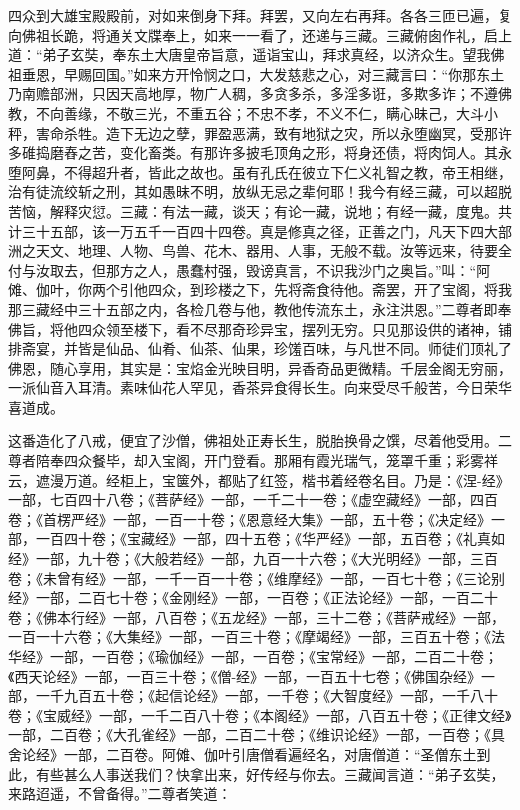 \documentclass[12pt,UTF8]{ctexbook}
\begin{document}
{	四众到大雄宝殿殿前，对如来倒身下拜。拜罢，又向左右再拜。各各三匝已遍，复向佛祖长跪，将通关文牒奉上，如来一一看了，还递与三藏。三藏俯囱作礼，启上道：“弟子玄奘，奉东土大唐皇帝旨意，遥诣宝山，拜求真经，以济众生。望我佛祖垂恩，早赐回国。”如来方开怜悯之口，大发慈悲之心，对三藏言曰：“你那东土乃南赡部洲，只因天高地厚，物广人稠，多贪多杀，多淫多诳，多欺多诈；不遵佛教，不向善缘，不敬三光，不重五谷；不忠不孝，不义不仁，瞒心昧己，大斗小秤，害命杀牲。造下无边之孽，罪盈恶满，致有地狱之灾，所以永堕幽冥，受那许多碓捣磨舂之苦，变化畜类。有那许多披毛顶角之形，将身还债，将肉饲人。其永堕阿鼻，不得超升者，皆此之故也。虽有孔氏在彼立下仁义礼智之教，帝王相继，治有徒流绞斩之刑，其如愚昧不明，放纵无忌之辈何耶！我今有经三藏，可以超脱苦恼，解释灾愆。三藏：有法一藏，谈天；有论一藏，说地；有经一藏，度鬼。共计三十五部，该一万五千一百四十四卷。真是修真之径，正善之门，凡天下四大部洲之天文、地理、人物、鸟兽、花木、器用、人事，无般不载。汝等远来，待要全付与汝取去，但那方之人，愚蠢村强，毁谤真言，不识我沙门之奥旨。”叫：“阿傩、伽叶，你两个引他四众，到珍楼之下，先将斋食待他。斋罢，开了宝阁，将我那三藏经中三十五部之内，各检几卷与他，教他传流东土，永注洪恩。”二尊者即奉佛旨，将他四众领至楼下，看不尽那奇珍异宝，摆列无穷。只见那设供的诸神，铺排斋宴，并皆是仙品、仙肴、仙茶、仙果，珍馐百味，与凡世不同。师徒们顶礼了佛恩，随心享用，其实是：宝焰金光映目明，异香奇品更微精。千层金阁无穷丽，一派仙音入耳清。素味仙花人罕见，香茶异食得长生。向来受尽千般苦，今日荣华喜道成。
	
	这番造化了八戒，便宜了沙僧，佛祖处正寿长生，脱胎换骨之馔，尽着他受用。二尊者陪奉四众餐毕，却入宝阁，开门登看。那厢有霞光瑞气，笼罩千重；彩雾祥云，遮漫万道。经柜上，宝箧外，都贴了红签，楷书着经卷名目。乃是：《涅-经》一部，七百四十八卷；《菩萨经》一部，一千二十一卷；《虚空藏经》一部，四百卷；《首楞严经》一部，一百一十卷；《恩意经大集》一部，五十卷；《决定经》一部，一百四十卷；《宝藏经》一部，四十五卷；《华严经》一部，五百卷；《礼真如经》一部，九十卷；《大般若经》一部，九百一十六卷；《大光明经》一部，三百卷；《未曾有经》一部，一千一百一十卷；《维摩经》一部，一百七十卷；《三论别经》一部，二百七十卷；《金刚经》一部，一百卷；《正法论经》一部，一百二十卷；《佛本行经》一部，八百卷；《五龙经》一部，三十二卷；《菩萨戒经》一部，一百一十六卷；《大集经》一部，一百三十卷；《摩竭经》一部，三百五十卷；《法华经》一部，一百卷；《瑜伽经》一部，一百卷；《宝常经》一部，二百二十卷；《西天论经》一部，一百三十卷；《僧-经》一部，一百五十七卷；《佛国杂经》一部，一千九百五十卷；《起信论经》一部，一千卷；《大智度经》一部，一千八十卷；《宝威经》一部，一千二百八十卷；《本阁经》一部，八百五十卷；《正律文经》一部，二百卷；《大孔雀经》一部，二百二十卷；《维识论经》一部，一百卷；《具舍论经》一部，二百卷。阿傩、伽叶引唐僧看遍经名，对唐僧道：“圣僧东土到此，有些甚么人事送我们？快拿出来，好传经与你去。三藏闻言道：“弟子玄奘，来路迢遥，不曾备得。”二尊者笑道：
	
}
\end{document}
